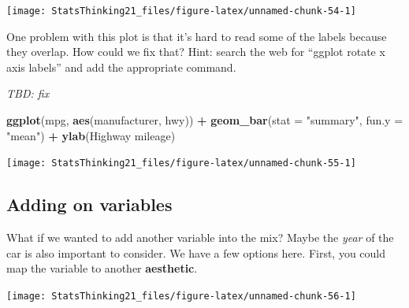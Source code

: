 \documentclass[
  12pt,
]{book}
\newenvironment{Shaded}{\begin{snugshade}}{\end{snugshade}}
\newcommand{\AttributeTok}[1]{\textcolor[rgb]{0.13,0.29,0.53}{#1}}
\newcommand{\CommentTok}[1]{\textcolor[rgb]{0.56,0.35,0.01}{\textit{#1}}}
\newcommand{\FunctionTok}[1]{\textcolor[rgb]{0.13,0.29,0.53}{\textbf{#1}}}
\newcommand{\NormalTok}[1]{#1}
\newcommand{\OtherTok}[1]{\textcolor[rgb]{0.56,0.35,0.01}{#1}}
\newcommand{\SpecialCharTok}[1]{\textcolor[rgb]{0.81,0.36,0.00}{\textbf{#1}}}
\newcommand{\StringTok}[1]{\textcolor[rgb]{0.31,0.60,0.02}{#1}}
\begin{document}
\texttt{[image: StatsThinking21\_files/figure-latex/unnamed-chunk-54-1]}

One problem with this plot is that it's hard to read some of the labels because they overlap. How could we fix that? Hint: search the web for ``ggplot rotate x axis labels'' and add the appropriate command.

\emph{TBD: fix}

\begin{Shaded}
\begin{Highlighting}[]
\FunctionTok{ggplot}\NormalTok{(mpg, }\FunctionTok{aes}\NormalTok{(manufacturer, hwy)) }\SpecialCharTok{+}
  \FunctionTok{geom\_bar}\NormalTok{(}\AttributeTok{stat =} \StringTok{"summary"}\NormalTok{, }\AttributeTok{fun.y =} \StringTok{"mean"}\NormalTok{)  }\SpecialCharTok{+} 
  \FunctionTok{ylab}\NormalTok{(}\StringTok{\textquotesingle{}Highway mileage\textquotesingle{}}\NormalTok{)}
\end{Highlighting}
\end{Shaded}

\texttt{[image: StatsThinking21\_files/figure-latex/unnamed-chunk-55-1]}

\hypertarget{adding-on-variables}{%
\subsection{Adding on variables}\label{adding-on-variables}}

What if we wanted to add another variable into the mix? Maybe the \emph{year} of the car is also important to consider. We have a few options here. First, you could map the variable to another \textbf{aesthetic}.

\begin{Shaded}
\end{Shaded}

\texttt{[image: StatsThinking21\_files/figure-latex/unnamed-chunk-56-1]}
\end{document}
